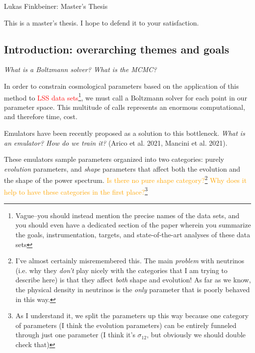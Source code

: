 \documentclass[11pt]{article}
\begin{document}
\fontsize{12}{15}

\begin{center}
Lukas Finkbeiner: Master's Thesis
\end{center}

This is a master's thesis. I hope to defend it to your satisfaction.

\begin{centering}
\section*{Introduction: overarching themes and goals}
\end{centering}

\textit{What is a Boltzmann solver? What is the MCMC?}

In order to constrain cosmological parameters based on the application of this
method to \textcolor{red}{LSS data sets}\footnote{
	Vague--you should instead mention the precise names of the data sets,
	and you should even have a dedicated section of the paper wherein you
	summarize the goals, instrumentation, targets, and state-of-the-art
	analyses of these data sets
}, we must call a Boltzmann solver for each point in our parameter space. This
multitude of calls represents an enormous computational, and therefore time,
cost.

Emulators have been recently proposed as a solution to this bottleneck.
\textit{What is an emulator? How do we train it?} (Arico et al. 2021, Mancini
et al. 2021).

These emulators sample parameters organized into two categories: purely
\textit{evolution} parameters, and \textit{shape} parameters that
affect both the evolution and the
shape of the power spectrum. \textcolor{orange}{Is there no pure shape
category?\footnote{
    I've almost certainly misremembered this.
    The main \textit{problem} with neutrinos (i.e. why they \textit{don't}
    play nicely with the categories that I am trying to describe here)
    is that they affect \textit{both} shape and evolution! As far as we know,
    the physical density in neutrinos is the \textit{only} parameter that
    is poorly behaved in this way.
}
Why does it help to have these categories in the first place?}\footnote{
    As I understand it, we split the parameters up this way because
    one category of parameters (I think the evolution parameters)
    can be entirely funneled through just one parameter
    (I think it's $\sigma_{12}$, but obviously we should double check that)
}
\end{document}
